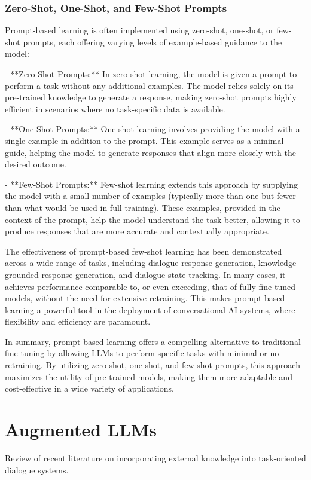 \subsubsection{Zero-Shot, One-Shot, and Few-Shot Prompts}

Prompt-based learning is often implemented using zero-shot, one-shot, or few-shot prompts, each offering varying levels of example-based guidance to the model:

- **Zero-Shot Prompts:** In zero-shot learning, the model is given a prompt to perform a task without any additional examples. The model relies solely on its pre-trained knowledge to generate a response, making zero-shot prompts highly efficient in scenarios where no task-specific data is available.

- **One-Shot Prompts:** One-shot learning involves providing the model with a single example in addition to the prompt. This example serves as a minimal guide, helping the model to generate responses that align more closely with the desired outcome.

- **Few-Shot Prompts:** Few-shot learning extends this approach by supplying the model with a small number of examples (typically more than one but fewer than what would be used in full training). These examples, provided in the context of the prompt, help the model understand the task better, allowing it to produce responses that are more accurate and contextually appropriate.

The effectiveness of prompt-based few-shot learning has been demonstrated across a wide range of tasks, including dialogue response generation, knowledge-grounded response generation, and dialogue state tracking. In many cases, it achieves performance comparable to, or even exceeding, that of fully fine-tuned models, without the need for extensive retraining. This makes prompt-based learning a powerful tool in the deployment of conversational AI systems, where flexibility and efficiency are paramount.

In summary, prompt-based learning offers a compelling alternative to traditional fine-tuning by allowing LLMs to perform specific tasks with minimal or no retraining. By utilizing zero-shot, one-shot, and few-shot prompts, this approach maximizes the utility of pre-trained models, making them more adaptable and cost-effective in a wide variety of applications.

\section{Augmented LLMs}
Review of recent literature on incorporating external knowledge into task-oriented dialogue systems.

